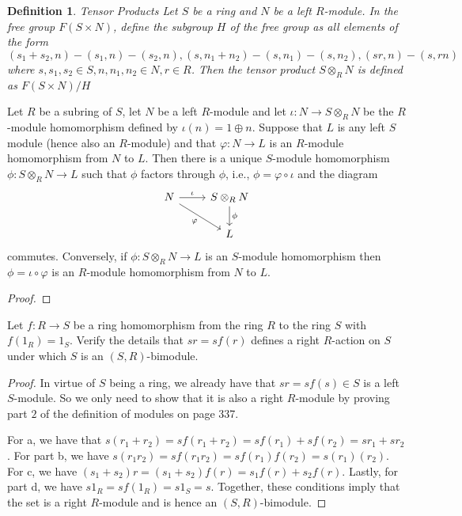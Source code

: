 \documentclass[10pt]{article}
\newtheorem{definition}{Definition}
\newenvironment{problem}[2][Problem]{\begin{trivlist}
		\item[\hskip \labelsep {\bfseries #1}\hskip \labelsep {\bfseries #2.}]}{\end{trivlist}}
\newenvironment{theorem}[2][Theorem]{\begin{trivlist}
		\item[\hskip \labelsep {\bfseries #1}\hskip \labelsep {\bfseries #2.}]}{\end{trivlist}}
\begin{document}
	\begin{definition}{Tensor Products}
		Let $S$ be a ring and $N$ be a left $R$-module. In the free group $F(S\times N)$, define the subgroup $H$ of the free group as all elements of the form $(s_1+s_2,n)-(s_1,n)-(s_2,n), (s,n_1+n_2)-(s,n_1)-(s,n_2), (sr,n)-(s,rn)$ where $s, s_1, s_2 \in S, n, n_1, n_2 \in N, r \in R$. Then the tensor product $S \otimes_R N$ is defined as $F(S\times N)/H$
	\end{definition}
	
	\begin{theorem}{8}
		Let $R$ be a subring of $S$, let $N$ be a left $R$-module and let $\iota : N \rightarrow S \otimes_R N$ be the $R$-module homomorphism defined by $\iota(n) = 1\oplus n$. Suppose that $L$ is any left $S$ module (hence also an $R$-module) and that $\varphi: N \rightarrow L$ is an $R$-module homomorphism	from $N$ to $L$. Then there is a unique $S$-module homomorphism $\phi : S \otimes_R N \rightarrow L$ such	that $\phi$ factors through $\phi$, i.e., $\phi = \varphi \circ \iota$ and the diagram
		\[ \begin{tikzcd}
			N \arrow[rd, "\varphi"'] \arrow{r}{\iota} & S\otimes_RN \arrow{d}{\phi} \\%
			& L
		\end{tikzcd}
		\]
		commutes. Conversely, if $\phi : S \otimes_R N \rightarrow L$ is an $S$-module homomorphism then $\phi = \iota \circ \varphi$ is an $R$-module homomorphism from $N$ to $L$.
		\begin{proof}
			
		\end{proof}
	\end{theorem}
	
	\begin{problem}{4.1}
		Let $f:R \rightarrow S$ be a ring homomorphism from the ring $R$ to the ring $S$ with $f(1_R)=1_S.$ Verify the details that $sr=sf(r)$ defines a right $R$-action on $S$ under which $S$ is an $(S,R)$-bimodule.
		\begin{proof}
			In virtue of $S$ being a ring, we already have that $sr=sf(s) \in S$ is a left $S$-module. So we only need to show that it is also a right $R$-module by proving part $2$ of the definition of modules on page 337.
			
			For a, we have that $s(r_1 + r_2) = sf(r_1 + r_2) = sf(r_1) + sf(r_2) = sr_1 + sr_2$. For part b, we have $s(r_1r_2) = sf(r_1r_2) = sf(r_1)f(r_2) = s(r_1)(r_2)$. For c, we have $(s_1 + s_2)r = (s_1 + s_2)f(r) = s_1f(r) + s_2f(r)$. Lastly, for part d, we have $s1_R = sf(1_R) = s1_S = s$. Together, these conditions imply that the set is a right $R$-module and is hence an $(S,R)$-bimodule.
		\end{proof}
	\end{problem}
	
\end{document}
